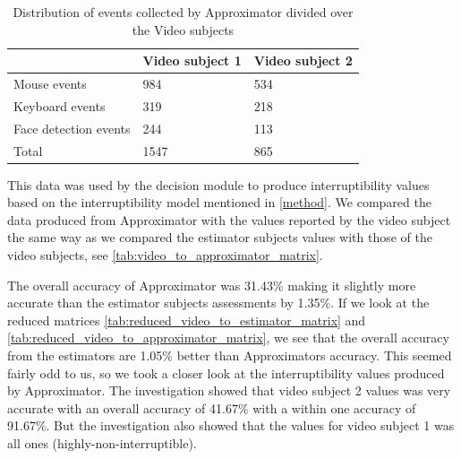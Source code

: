 \documentclass{sigchi}
\begin{document}
\begin{table}[h]
  \begin{tabular}{@{}lll@{}}
    \toprule
     & Video subject 1 & Video subject 2\\ \midrule
    Mouse events       & 984    & 534    \\
    Keyboard events       & 319    & 218    \\
    Face detection events       & 244    & 113    \\ \midrule
    Total   & 1547 & 865\\ \bottomrule
  \end{tabular}
  \caption{Distribution of events collected by Approximator divided over the Video subjects}
  \label{tab:event_distribution}
\end{table}

This data was used by the decision module to produce interruptibility values based on the interruptibility model mentioned in \autoref{method}.
We compared the data produced from Approximator with the values reported by the video subject the same way as we compared the estimator subjects values with those of the video subjects, see \autoref{tab:video_to_approximator_matrix}.

The overall accuracy of Approximator was 31.43\% making it slightly more accurate than the estimator subjects assessments by 1.35\%.
If we look at the reduced matrices \autoref{tab:reduced_video_to_estimator_matrix} and \autoref{tab:reduced_video_to_approximator_matrix}, we see that the overall accuracy from the estimators are 1.05\% better than Approximators accuracy.
This seemed fairly odd to us, so we took a closer look at the interruptibility values produced by Approximator.
The investigation showed that video subject 2 values was very accurate with an overall accuracy of 41.67\% with a within one accuracy of 91.67\%.
But the investigation also showed that the values for video subject 1 was all ones (highly-non-interruptible).
\end{document}
